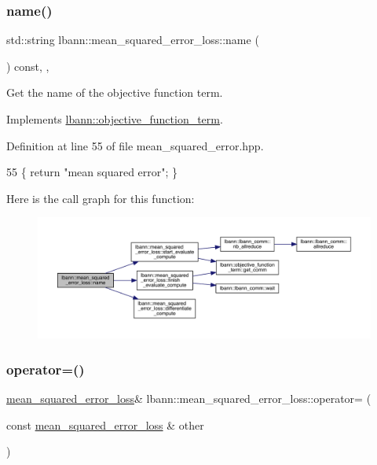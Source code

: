 \subsubsection{\texorpdfstring{name()}{name()}}
{\footnotesize\ttfamily std\+::string lbann\+::mean\+\_\+squared\+\_\+error\+\_\+loss\+::name (\begin{DoxyParamCaption}{ }\end{DoxyParamCaption}) const\hspace{0.3cm}{\ttfamily [inline]}, {\ttfamily [override]}, {\ttfamily [virtual]}}

Get the name of the objective function term. 

Implements \hyperlink{classlbann_1_1objective__function__term_a964fbfad3dd0434aa8f32c5fedf1079a}{lbann\+::objective\+\_\+function\+\_\+term}.



Definition at line 55 of file mean\+\_\+squared\+\_\+error.\+hpp.


\begin{DoxyCode}
55 \{ \textcolor{keywordflow}{return} \textcolor{stringliteral}{"mean squared error"}; \}
\end{DoxyCode}
Here is the call graph for this function\+:\nopagebreak
\begin{figure}[H]
\begin{center}
\leavevmode
\includegraphics[width=350pt]{classlbann_1_1mean__squared__error__loss_ab34d59b168205f198b1d4c299365fbbb_cgraph}
\end{center}
\end{figure}
\mbox{\label{classlbann_1_1mean__squared__error__loss_a7b992996646a230f132a4df1608f1973}} 
\subsubsection{\texorpdfstring{operator=()}{operator=()}}
{\footnotesize\ttfamily \hyperlink{classlbann_1_1mean__squared__error__loss}{mean\+\_\+squared\+\_\+error\+\_\+loss}\& lbann\+::mean\+\_\+squared\+\_\+error\+\_\+loss\+::operator= (\begin{DoxyParamCaption}\item[{const \hyperlink{classlbann_1_1mean__squared__error__loss}{mean\+\_\+squared\+\_\+error\+\_\+loss} \&}]{other }\end{DoxyParamCaption})\hspace{0.3cm}{\ttfamily [default]}}

